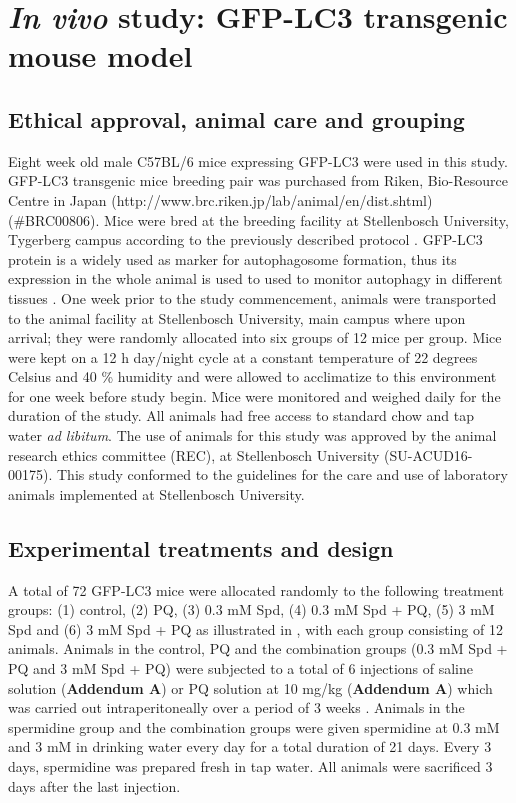 \section{\textit{In vivo} study: GFP-LC3 transgenic mouse model}
\subsection{Ethical approval, animal care and grouping}
Eight week old male C57BL/6 mice expressing GFP-LC3 were used in this study. GFP-LC3 transgenic mice breeding pair was purchased from Riken, Bio-Resource Centre in Japan (http://www.brc.riken.jp/lab/animal/en/dist.shtml) (\#BRC00806). Mice were bred at the breeding facility at Stellenbosch University, Tygerberg campus according to the previously described protocol \citep{Mizushima2009,Mizushima2004a}. GFP-LC3 protein is a widely used as marker for autophagosome formation, thus its expression in the whole animal is used to used to monitor autophagy in different tissues \citep{Mizushima2009}. One week prior to the study commencement, animals were transported to the animal facility at Stellenbosch University, main campus where upon arrival; they were randomly allocated into six groups of 12 mice per group. Mice were kept on a 12 h day/night cycle at a constant temperature of 22 degrees Celsius and 40 \% humidity and were allowed to acclimatize to this environment for one week before study begin. Mice were monitored and weighed daily for the duration of the study. All animals had free access to standard chow and tap water \textit{ad libitum}. The use of animals for this study was approved by the animal research ethics committee (REC), at Stellenbosch University (SU-ACUD16-00175). This study conformed to the guidelines for the care and use of laboratory animals implemented at Stellenbosch University.

\subsection{Experimental treatments and design}
A total of 72 GFP-LC3 mice were allocated randomly to the following treatment groups: (1) control, (2) PQ, (3) 0.3 mM Spd, (4) 0.3 mM Spd + PQ, (5) 3 mM Spd and (6) 3 mM Spd + PQ as illustrated in  , with each group consisting of 12 animals. Animals in the control, PQ and the combination groups (0.3 mM Spd + PQ and 3 mM Spd + PQ) were subjected to a total of 6 injections of saline solution (\textbf{Addendum A}) or PQ solution at 10 mg/kg (\textbf{Addendum A}) which was carried out intraperitoneally over a period of 3 weeks \citep{Chen2012}. Animals in the spermidine group and the combination groups were given spermidine at 0.3 mM and 3 mM in drinking water every day for a total duration of 21 days. Every 3 days, spermidine was prepared fresh in tap water. All animals were sacrificed 3 days after the last injection.

